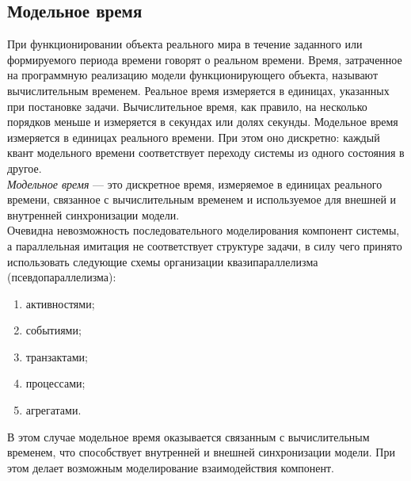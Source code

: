 \documentclass[12pt]{article}
\begin{document}
\subsection{Модельное время}
При функционировании объекта реального мира в течение заданного или формируемого периода времени говорят о реальном времени. Время, затраченное на программную реализацию модели функционирующего объекта, называют вычислительным временем. Реальное время измеряется в единицах, указанных при постановке задачи. Вычислительное время, как правило, на несколько порядков меньше и измеряется в секундах или долях секунды. Модельное время измеряется в единицах реального времени. При этом оно дискретно: каждый квант модельного времени соответствует переходу системы из одного состояния в другое.\\

\emph{Модельное время} --- это дискретное время, измеряемое в единицах реального времени, связанное с вычислительным временем и используемое для внешней и внутренней синхронизации модели.\\

Очевидна невозможность последовательного моделирования компонент системы, а параллельная имитация не соответствует структуре задачи, в силу чего принято использовать следующие схемы организации квазипараллелизма (псевдопараллелизма):

\begin{enumerate}
	\item активностями;
	\item событиями;
	\item транзактами;
	\item процессами;
	\item агрегатами.
\end{enumerate}

В этом случае модельное время оказывается связанным с вычислительным временем, что способствует внутренней и внешней синхронизации модели. При этом делает возможным моделирование взаимодействия компонент.
\end{document}
